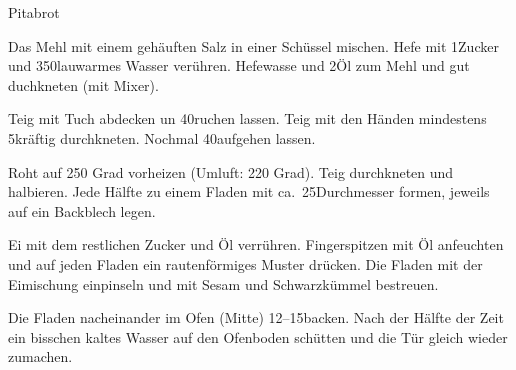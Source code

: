 \begin{recipe}[\vegetarian]{Pitabrot}

    \begin{ingredients}
    \end{ingredients}

    \begin{instructions}
        Das Mehl mit einem gehäuften \tl Salz in einer Schüssel mischen.
        Hefe mit 1\tl Zucker und 350\milliliter lauwarmes Wasser verühren.
        Hefewasse und 2\el Öl zum Mehl und gut duchkneten (mit Mixer).

        Teig mit Tuch abdecken un 40\minutes ruchen lassen.
        Teig mit den Händen mindestens 5\minutes kräftig durchkneten.
        Nochmal 40\minutes aufgehen lassen.

        Roht auf 250 Grad vorheizen (Umluft: 220 Grad).
        Teig durchkneten und halbieren.
        Jede Hälfte zu einem Fladen mit ca.\ 25\cm Durchmesser formen, jeweils auf ein Backblech legen.

        Ei mit dem restlichen Zucker und Öl verrühren.
        Fingerspitzen mit Öl anfeuchten und auf jeden Fladen ein rautenförmiges Muster drücken.
        Die Fladen mit der Eimischung einpinseln und mit Sesam und Schwarzkümmel bestreuen.

        Die Fladen nacheinander im Ofen (Mitte) 12--15\minutes backen.
        Nach der Hälfte der Zeit ein bisschen kaltes Wasser auf den Ofenboden schütten und die Tür gleich wieder zumachen.
    \end{instructions}
\end{recipe}
